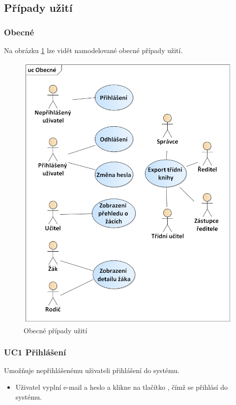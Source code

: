 \clearpage
\subsection{Případy užití}
\subsubsection{Obecné}
Na obrázku \ref{pripady-obecne} lze vidět namodelované obecné případy užití.

\begin{figure}[h]
	\centering
	\includegraphics[width=\textwidth]{images/obecne.png}
	\caption{Obecné případy užití}
	\label{pripady-obecne}
\end{figure}

\subsubsection*{UC1 Přihlášení}
Umožňuje nepřihlášenému uživateli přihlášení do systému. 
\begin{itemize}
    \item Uživatel vyplní e-mail a heslo a klikne na tlačítko , čímž se přihlásí do systému.
\end{itemize}

